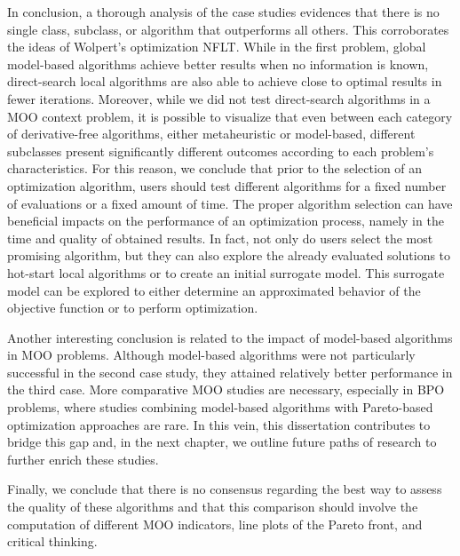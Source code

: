 In conclusion, a thorough analysis of the case studies evidences that there is no single class, subclass, or algorithm that outperforms all others. This corroborates the ideas of Wolpert's optimization \ac{NFLT}\cite{Wolpert1997NFLT}. While in the first problem, global model-based algorithms achieve better results when no information is known, direct-search local algorithms are also able to achieve close to optimal results in fewer iterations. Moreover, while we did not test direct-search algorithms in a \ac{MOO} context problem, it is possible to visualize that even between each category of derivative-free algorithms, either metaheuristic or model-based, different subclasses present significantly different outcomes according to each problem's characteristics. For this reason, we conclude that prior to the selection of an optimization algorithm, users should test different algorithms for a fixed number of evaluations or a fixed amount of time. The proper algorithm selection can have beneficial impacts on the performance of an optimization process, namely in the time and quality of obtained results. In fact, not only do users select the most promising algorithm, but they can also explore the already evaluated solutions to hot-start local algorithms or to create an initial surrogate model. This surrogate model can be explored to either determine an approximated behavior of the objective function or to perform optimization. 

Another interesting conclusion is related to the impact of model-based algorithms in \ac{MOO} problems. Although model-based algorithms were not particularly successful in the second case study, they attained relatively better performance in the third case. More comparative \ac{MOO} studies are necessary, especially in \ac{BPO} problems, where studies combining model-based algorithms with Pareto-based optimization approaches are rare. In this vein, this dissertation contributes to bridge this gap and, in the next chapter, we outline future paths of research to further enrich these studies.

Finally, we conclude that there is no consensus regarding the best way to assess the quality of these algorithms and that this comparison should involve the computation of different \ac{MOO} indicators, line plots of the Pareto front, and critical thinking. 